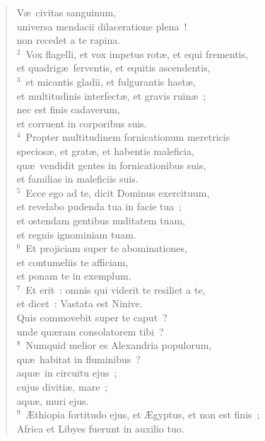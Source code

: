 \begin{flushleft}\begin{verse}\vspace{-19pt}V\ae\ civitas sanguinum,\\ universa mendacii dilaceratione plena~!\\ non recedet a te rapina.\\
${}^{2}$~Vox flagelli, et vox impetus rot\ae , et equi frementis,\\ et quadrig\ae\ ferventis, et equitis ascendentis,\\
${}^{3}$~et micantis gladii, et fulgurantis hast\ae ,\\ et multitudinis interfect\ae , et gravis ruin\ae~;\\ nec est finis cadaverum,\\ et corruent in corporibus suis.\\
${}^{4}$~Propter multitudinem fornicationum meretricis\\ specios\ae , et grat\ae , et habentis maleficia,\\ qu\ae\ vendidit gentes in fornicationibus suis,\\ et familias in maleficiis suis.\\
${}^{5}$~Ecce ego ad te, dicit Dominus exercituum,\\ et revelabo pudenda tua in facie tua~;\\ et ostendam gentibus nuditatem tuam,\\ et regnis ignominiam tuam.\\
${}^{6}$~Et projiciam super te abominationes,\\ et contumeliis te afficiam,\\ et ponam te in exemplum.\\
${}^{7}$~Et erit~: omnis qui viderit te resiliet a te,\\ et dicet~: Vastata est Ninive.\\ Quis commovebit super te caput~?\\ unde qu\ae ram consolatorem tibi~?\\
${}^{8}$~Numquid melior es Alexandria populorum,\\ qu\ae\ habitat in fluminibus~?\\ aqu\ae\ in circuitu ejus~;\\ cujus diviti\ae , mare~;\\ aqu\ae , muri ejus.\\
${}^{9}$~\AE thiopia fortitudo ejus, et \AE gyptus, et non est finis~;\\ Africa et Libyes fuerunt in auxilio tuo.\\

\end{verse}
\end{flushleft}
